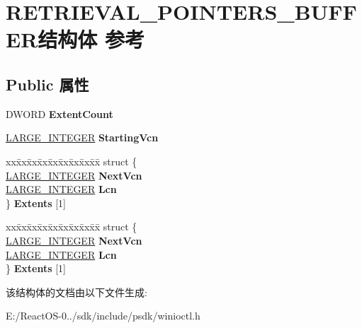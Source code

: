 \hypertarget{struct_r_e_t_r_i_e_v_a_l___p_o_i_n_t_e_r_s___b_u_f_f_e_r}{}\section{R\+E\+T\+R\+I\+E\+V\+A\+L\+\_\+\+P\+O\+I\+N\+T\+E\+R\+S\+\_\+\+B\+U\+F\+F\+E\+R结构体 参考}
\label{struct_r_e_t_r_i_e_v_a_l___p_o_i_n_t_e_r_s___b_u_f_f_e_r}
\subsection*{Public 属性}
\begin{DoxyCompactItemize}
\item 
\mbox{\label{struct_r_e_t_r_i_e_v_a_l___p_o_i_n_t_e_r_s___b_u_f_f_e_r_a5891acd8eda338d8019ede97ddca0258}} 
D\+W\+O\+RD {\bfseries Extent\+Count}
\item 
\mbox{\label{struct_r_e_t_r_i_e_v_a_l___p_o_i_n_t_e_r_s___b_u_f_f_e_r_aa6c14d6e609d0952939c823be2411dd1}} 
\hyperlink{union___l_a_r_g_e___i_n_t_e_g_e_r}{L\+A\+R\+G\+E\+\_\+\+I\+N\+T\+E\+G\+ER} {\bfseries Starting\+Vcn}
\item 
\mbox{\label{struct_r_e_t_r_i_e_v_a_l___p_o_i_n_t_e_r_s___b_u_f_f_e_r_a81f103be885857b00482b06e0e55625c}} 
\begin{tabbing}
xx\=xx\=xx\=xx\=xx\=xx\=xx\=xx\=xx\=\kill
struct \{\\
\>\hyperlink{union___l_a_r_g_e___i_n_t_e_g_e_r}{LARGE\_INTEGER} {\bfseries NextVcn}\\
\>\hyperlink{union___l_a_r_g_e___i_n_t_e_g_e_r}{LARGE\_INTEGER} {\bfseries Lcn}\\
\} {\bfseries Extents} \mbox{[}1\mbox{]}\\

\end{tabbing}\item 
\mbox{\label{struct_r_e_t_r_i_e_v_a_l___p_o_i_n_t_e_r_s___b_u_f_f_e_r_a89e9bfe7b1961441abf8242f10029480}} 
\begin{tabbing}
xx\=xx\=xx\=xx\=xx\=xx\=xx\=xx\=xx\=\kill
struct \{\\
\>\hyperlink{union___l_a_r_g_e___i_n_t_e_g_e_r}{LARGE\_INTEGER} {\bfseries NextVcn}\\
\>\hyperlink{union___l_a_r_g_e___i_n_t_e_g_e_r}{LARGE\_INTEGER} {\bfseries Lcn}\\
\} {\bfseries Extents} \mbox{[}1\mbox{]}\\

\end{tabbing}\end{DoxyCompactItemize}


该结构体的文档由以下文件生成\+:\begin{DoxyCompactItemize}
\item 
E\+:/\+React\+O\+S-\/0../sdk/include/psdk/winioctl.\+h\end{DoxyCompactItemize}
